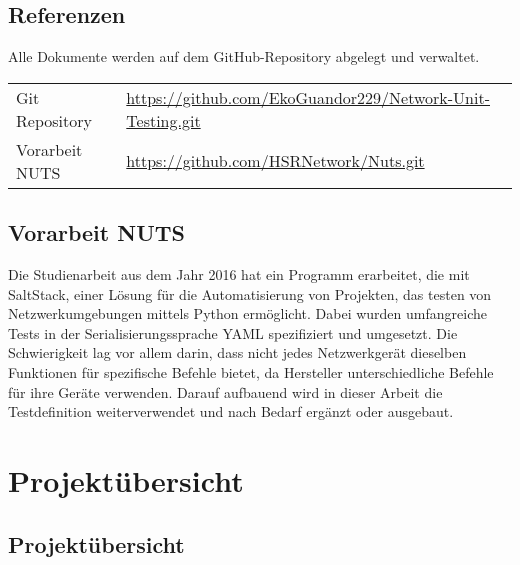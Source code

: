 \documentclass[
	ngerman,
	toc=listof, %
	toc=bibliography, %
	footnotes=multiple, %
	parskip=half, %
	numbers=noendperiod %
]{scrartcl}
\begin{document}
	\subsection{Referenzen}
		Alle Dokumente werden auf dem GitHub-Repository abgelegt und verwaltet.

	\begin{tabularx}{\textwidth}{lX}
		Git Repository & \url{https://github.com/EkoGuandor229/Network-Unit-Testing.git} \\
		Vorarbeit NUTS & \url{https://github.com/HSRNetwork/Nuts.git}\\
	\end{tabularx}

	\subsection{Vorarbeit NUTS}
		Die Studienarbeit aus dem Jahr 2016 hat ein Programm erarbeitet, die mit SaltStack, einer Lösung für die Automatisierung von Projekten, das testen von Netzwerkumgebungen mittels Python ermöglicht.
		Dabei wurden umfangreiche Tests in der Serialisierungssprache YAML spezifiziert und umgesetzt. 
		Die Schwierigkeit lag vor allem darin, dass nicht jedes Netzwerkgerät dieselben Funktionen für spezifische Befehle bietet, da Hersteller unterschiedliche Befehle für ihre Geräte verwenden.	
		Darauf aufbauend wird in dieser Arbeit die Testdefinition weiterverwendet und nach Bedarf ergänzt oder ausgebaut.

\section{Projektübersicht}

	\subsection{Projektübersicht}
\end{document}
